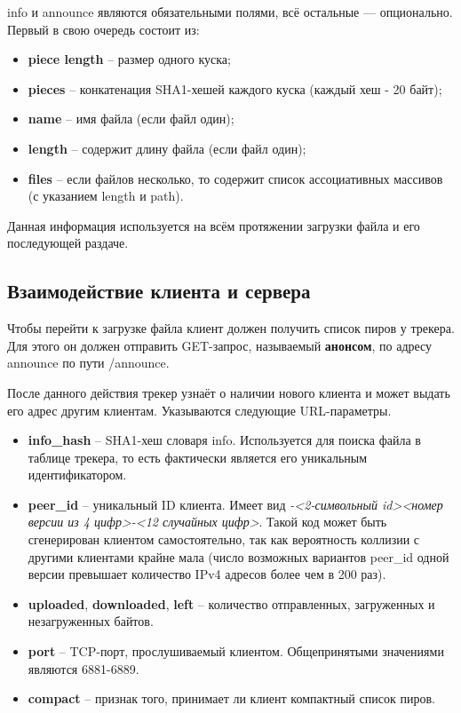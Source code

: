 info и announce являются обязательными полями, всё остальные — опционально. Первый в свою очередь состоит из:
\begin{itemize}
	\item \textbf{piece length} -- размер одного куска;
	
	\item \textbf{pieces} -- конкатенация SHA1-хешей каждого куска (каждый хеш - 20 байт);
	
	\item \textbf{name} -- имя файла (если файл один);
	
	\item \textbf{length} -- содержит длину файла (если файл один);
	
	\item \textbf{files} -- если файлов несколько, то содержит список ассоциативных массивов (с указанием length и path). \\
\end{itemize}

Данная информация используется на всём протяжении загрузки файла и его последующей раздаче. \newline

\subsection{Взаимодействие клиента и сервера}
Чтобы перейти к загрузке файла клиент должен получить список пиров у трекера. Для этого он должен отправить GET-запрос, называемый \textbf{анонсом}, по адресу announce по пути /announce. 

После данного действия трекер узнаёт о наличии нового клиента и может выдать его адрес другим клиентам. Указываются следующие URL-параметры.

\begin{itemize}
	\item \textbf{info\_hash} -- SHA1-хеш словаря info. Используется для поиска файла в таблице трекера, то есть фактически является его уникальным идентификатором.
	
	\item \textbf{peer\_id} -- уникальный ID клиента. Имеет вид \textit{-<2-символьный id><номер версии из 4 цифр>-<12 случайных цифр>}. Такой код может быть сгенерирован клиентом самостоятельно, так как вероятность коллизии с другими клиентами крайне мала (число возможных вариантов peer\_id одной версии превышает количество IPv4 адресов более чем в 200 раз).
	
	\item \textbf{uploaded}, \textbf{downloaded}, \textbf{left} -- количество отправленных, загруженных и незагруженных байтов.
	
	\item \textbf{port} -- TCP-порт, прослушиваемый клиентом. Общепринятыми значениями являются 6881-6889.
	
	\item \textbf{compact} -- признак того, принимает ли клиент компактный список пиров. \\
	
\end{itemize}


